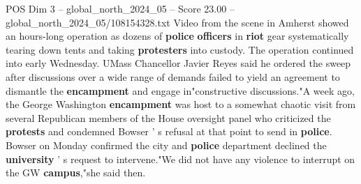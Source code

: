 \begin{textsample}{POS Dim 3 – global\_north\_2024\_05 – Score 23.00 – global\_north\_2024\_05/108154328.txt}
Video from the scene in Amherst showed an hours-long operation as dozens of \textbf{police} \textbf{officers} in \textbf{riot} gear systematically tearing down tents and taking \textbf{protesters} into custody.
The operation continued into early Wednesday.
UMass Chancellor Javier Reyes said he ordered the sweep after discussions over a wide range of demands failed to yield an agreement to dismantle the \textbf{encampment} and engage in"constructive discussions."A week ago, the George Washington \textbf{encampment} was host to a somewhat chaotic visit from several Republican members of the House oversight panel who criticized the \textbf{protests} and condemned Bowser ' s refusal at that point to send in \textbf{police}.
Bowser on Monday confirmed the city and \textbf{police} department declined the \textbf{university} ' s request to intervene."We did not have any violence to interrupt on the GW \textbf{campus},"she said then.

\end{textsample}
